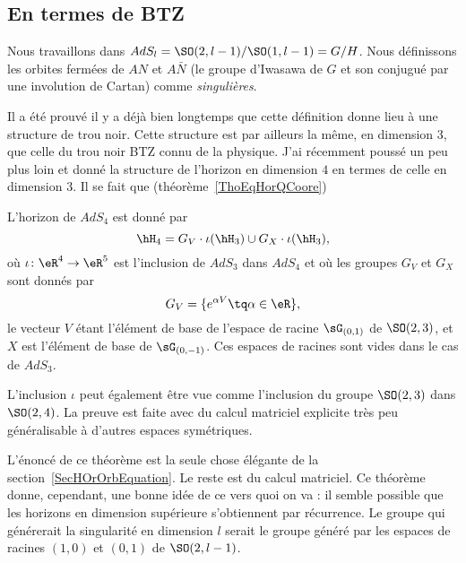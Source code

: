 \subsection{En termes de BTZ}

Nous travaillons dans $AdS_l=\SO(2,l-1)/\SO(1,l-1)=G/H$. Nous définissons les orbites fermées de $AN$ et $A\bar N$ (le groupe d'Iwasawa de $G$ et son conjugué par une involution de Cartan) comme \emph{singulières}.

Il a été prouvé il y a déjà bien longtemps que cette définition donne lieu à une structure de trou noir. Cette structure est par ailleurs la même, en dimension 3, que celle du trou noir BTZ connu de la physique. J'ai récemment poussé un peu plus loin et donné la structure de l'horizon en dimension $4$ en termes de celle en dimension $3$. Il se fait que (théorème~\ref{ThoEqHorQCoore})

\begin{theorem}
	L'horizon de $AdS_4$ est donné par
	\begin{equation}
		\hH_4=G_V\cdot \iota(\hH_3)\cup G_X\cdot\iota(\hH_3),
	\end{equation}
	où $\iota\colon \eR^4\to \eR^5$ est l'inclusion de $AdS_3$ dans $AdS_4$ et où les groupes $G_V$ et $G_X$ sont donnés par
	\begin{equation}
		G_V=\{  e^{\alpha V}\tq\alpha\in\eR \},
	\end{equation}
	le vecteur $V$ étant l'élément de base de l'espace de racine $\sG_{(0,1)}$ de $\SO(2,3)$, et $X$ est l'élément de base de $\sG_{(0,-1)}$. Ces espaces de racines sont vides dans le cas de $AdS_3$.
\end{theorem}
L'inclusion $\iota$ peut également être vue comme l'inclusion du groupe $\SO(2,3)$ dans $\SO(2,4)$. La preuve est faite avec du calcul matriciel explicite très peu généralisable à d'autres espaces symétriques.

L'énoncé de ce théorème est la seule chose élégante de la section~\ref{SecHOrOrbEquation}. Le reste est du calcul matriciel. Ce théorème donne, cependant, une bonne idée de ce vers quoi on va : il semble possible que les horizons en dimension supérieure s'obtiennent par récurrence. Le groupe qui générerait la singularité en dimension $l$ serait le groupe généré par les espaces de racines $(1,0)$ et $(0,1)$ de $\SO(2,l-1)$.

